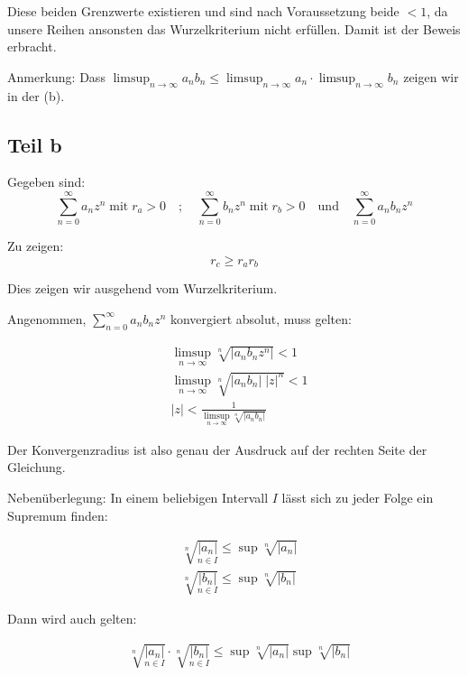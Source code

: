 \documentclass[a4paper,german,12pt,smallheadings]{scrartcl}
\begin{document}
Diese beiden Grenzwerte existieren und sind nach Voraussetzung beide $<1$, da unsere Reihen ansonsten das Wurzelkriterium nicht erfüllen. Damit ist der Beweis erbracht.

Anmerkung: Dass $\limsup_{n \to \infty} a_nb_n \leq \limsup_{n \to \infty} a_n \cdot \limsup_{n \to \infty} b_n$ zeigen wir in der (b).

\subsection*{Teil b}

Gegeben sind:
\begin{equation*}
  \sum\limits_{n=0}^{\infty} a_n z^n \; \text{mit} \; r_a>0\quad ; \quad \sum\limits_{n=0}^{\infty} b_n z^n \; \text{mit} \; r_b>0 \quad \text{und} \quad  \sum\limits_{n=0}^{\infty} a_n b_n z^n
\end{equation*}

Zu zeigen:
\begin{equation*}
  r_c \geq r_a r_b
\end{equation*}

Dies zeigen wir ausgehend vom Wurzelkriterium.

Angenommen, $\sum\limits_{n=0}^{\infty} a_n b_n z^n$ konvergiert absolut, muss gelten:

\begin{align*}
  & \limsup\limits_{n \to \infty} \sqrt[n]{|a_n b_n z^n|} < 1 \\
  & \limsup\limits_{n \to \infty} \sqrt[n]{|a_n b_n| \; |z|^n} < 1\\
  & |z| < \frac{1}{\limsup\limits_{n \to \infty} \sqrt[n]{|a_n b_n|}}
\end{align*}

Der Konvergenzradius ist also genau der Ausdruck auf der rechten Seite der Gleichung.

Nebenüberlegung: In einem beliebigen Intervall $I$ lässt sich zu jeder Folge ein Supremum finden:

\begin{align*}
  & \sqrt[n]{\underset{n \in I}{|a_n|}} \leq \sup \sqrt[n]{|a_n|}\\
  & \sqrt[n]{\underset{n \in I}{|b_n|}} \leq \sup \sqrt[n]{|b_n|}
\end{align*}

Dann wird auch gelten:

\begin{align*}
  & \sqrt[n]{\underset{n \in I}{|a_n|}} \cdot \sqrt[n]{\underset{n \in I}{|b_n|}} \leq \sup \sqrt[n]{|a_n|} \sup \sqrt[n]{|b_n|}
\end{align*}
\end{document}
